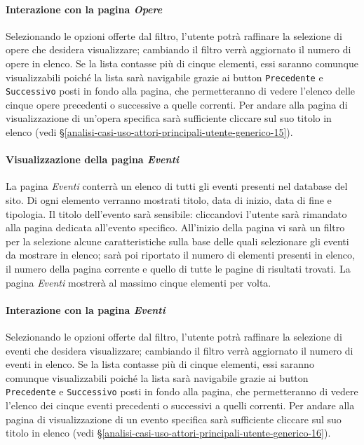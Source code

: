\paragraph{Interazione con la pagina \textit{Opere}}
\label{analisi-casi-uso-attori-principali-utente-generico-5}
Selezionando le opzioni offerte dal filtro, l'utente potrà raffinare la selezione di opere che desidera visualizzare; cambiando il filtro verrà aggiornato il numero di opere in elenco. Se la lista contasse più di cinque elementi, essi saranno comunque visualizzabili poiché la lista sarà navigabile grazie ai button \texttt{Precedente} e \texttt{Successivo} posti in fondo alla pagina, che permetteranno di vedere l'elenco delle cinque opere precedenti o successive a quelle correnti. Per andare alla pagina di visualizzazione di un'opera specifica sarà sufficiente cliccare sul suo titolo in elenco (vedi §\ref{analisi-casi-uso-attori-principali-utente-generico-15}).


\paragraph{Visualizzazione della pagina \textit{Eventi}}
\label{analisi-casi-uso-attori-principali-utente-generico-6}
La pagina \textit{Eventi} conterrà un elenco di tutti gli eventi presenti nel database del sito. Di ogni elemento verranno mostrati titolo, data di inizio, data di fine e tipologia. Il titolo dell'evento sarà sensibile: cliccandovi l'utente sarà rimandato alla pagina dedicata all'evento specifico. All'inizio della pagina vi sarà un filtro per la selezione alcune caratteristiche sulla base delle quali selezionare gli eventi da mostrare in elenco; sarà poi riportato il numero di elementi presenti in elenco, il numero della pagina corrente e quello di tutte le pagine di risultati trovati. La pagina \textit{Eventi} mostrerà al massimo cinque elementi per volta.


\paragraph{Interazione con la pagina \textit{Eventi}}
\label{analisi-casi-uso-attori-principali-utente-generico-7}
Selezionando le opzioni offerte dal filtro, l'utente potrà raffinare la selezione di eventi che desidera visualizzare; cambiando il filtro verrà aggiornato il numero di eventi in elenco. Se la lista contasse più di cinque elementi, essi saranno comunque visualizzabili poiché la lista sarà navigabile grazie ai button \texttt{Precedente} e \texttt{Successivo} posti in fondo alla pagina, che permetteranno di vedere l'elenco dei cinque eventi precedenti o successivi a quelli correnti. Per andare alla pagina di visualizzazione di un evento specifica sarà sufficiente cliccare sul suo titolo in elenco (vedi §\ref{analisi-casi-uso-attori-principali-utente-generico-16}).



